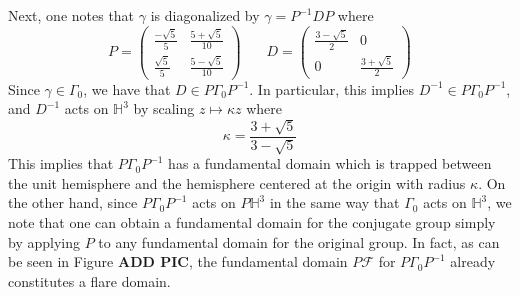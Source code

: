 \documentclass[]{article}
\begin{document}
Next, one notes that $\gamma$ is diagonalized by $\gamma = P^{-1}DP$ where
$$
P =
\begin{pmatrix}
	\frac{-\sqrt{5}}{5} & \frac{5 + \sqrt{5}}{10} \\
	\frac{\sqrt{5}}{5} & \frac{5 - \sqrt{5}}{10}
\end{pmatrix} ~~~~~~~~
D =
\begin{pmatrix}
	\frac{3 - \sqrt{5}}{2} & 0 \\
	0 & \frac{3 + \sqrt{5}}{2}
\end{pmatrix}
$$
Since $\gamma \in \Gamma_0$, we have that $D \in P\Gamma_0P^{-1}$.
In particular, this implies $D^{-1} \in P\Gamma_0P^{-1}$, and $D^{-1}$ acts on $\mathbb{H}^3$ by scaling $z \mapsto \kappa z$ where
$$
\kappa = \frac{3 + \sqrt{5}}{3 - \sqrt{5}}
$$
This implies that $P\Gamma_0P^{-1}$ has a fundamental domain which is trapped between the unit hemisphere and the hemisphere centered at the origin with radius $\kappa$.
On the other hand, since $P\Gamma_0P^{-1}$ acts on $P\mathbb{H}^3$ in the same way that $\Gamma_0$ acts on $\mathbb{H}^3$, we note that one can obtain a fundamental domain for the conjugate group simply by applying $P$ to any fundamental domain for the original group.
In fact, as can be seen in Figure \textbf{ADD PIC}, the fundamental domain $P\mathcal{F}$ for $P\Gamma_0P^{-1}$ already constitutes a flare domain.

\pagebreak

\printbibliography
\end{document}
